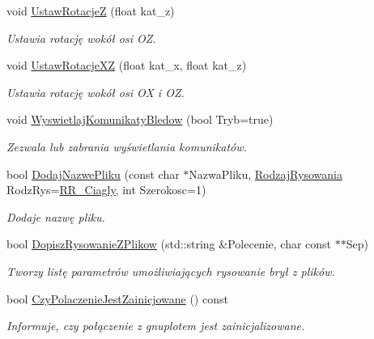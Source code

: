 \begin{DoxyCompactItemize}
void \hyperlink{class_pz_g_1_1_lacze_do_g_n_u_plota_a458399aa2a8f4b3f00ccd5b272857ea1}{Ustaw\+RotacjeZ} (float kat\+\_\+z)
\begin{DoxyCompactList}\small\item\em Ustawia rotację wokół osi {\itshape OZ}. \end{DoxyCompactList}\item 
void \hyperlink{class_pz_g_1_1_lacze_do_g_n_u_plota_a94d8527fd78048ed6cb32ffb29e5f903}{Ustaw\+Rotacje\+XZ} (float kat\+\_\+x, float kat\+\_\+z)
\begin{DoxyCompactList}\small\item\em Ustawia rotację wokół osi {\itshape OX} i {\itshape OZ}. \end{DoxyCompactList}\item 
void \hyperlink{class_pz_g_1_1_lacze_do_g_n_u_plota_a4531e6d166faf2e2c8bb4a54a9c9e1f8}{Wyswietlaj\+Komunikaty\+Bledow} (bool Tryb=true)
\begin{DoxyCompactList}\small\item\em Zezwala lub zabrania wyświetlania komunikatów. \end{DoxyCompactList}\item 
bool \hyperlink{class_pz_g_1_1_lacze_do_g_n_u_plota_a34bd48f57c0fd69c12bf4127a1cacd8f}{Dodaj\+Nazwe\+Pliku} (const char $\ast$Nazwa\+Pliku, \hyperlink{namespace_pz_g_a705c92106f39b7d0c34a6739d10ff0b6}{Rodzaj\+Rysowania} Rodz\+Rys=\hyperlink{namespace_pz_g_a705c92106f39b7d0c34a6739d10ff0b6a927eaa159aa4bd3198f0a330b967746d}{R\+R\+\_\+\+Ciagly}, int Szerokosc=1)
\begin{DoxyCompactList}\small\item\em Dodaje nazwę pliku. \end{DoxyCompactList}\item 
bool \hyperlink{class_pz_g_1_1_lacze_do_g_n_u_plota_ad3d7607946b82aa941d786dcd086d27e}{Dopisz\+Rysowanie\+Z\+Plikow} (std\+::string \&Polecenie, char const $\ast$$\ast$Sep)
\begin{DoxyCompactList}\small\item\em Tworzy listę parametrów umożliwiających rysowanie brył z plików. \end{DoxyCompactList}\item 
bool \hyperlink{class_pz_g_1_1_lacze_do_g_n_u_plota_af8be8aeb3b1b524fab67d4411cba5b9e}{Czy\+Polaczenie\+Jest\+Zainicjowane} () const
\begin{DoxyCompactList}\small\item\em Informuje, czy połączenie z {\itshape gnuplot\textquotesingle{}em} jest zainicjalizowane. \end{DoxyCompactList}\item 
$$
\end{DoxyCompactItemize}
